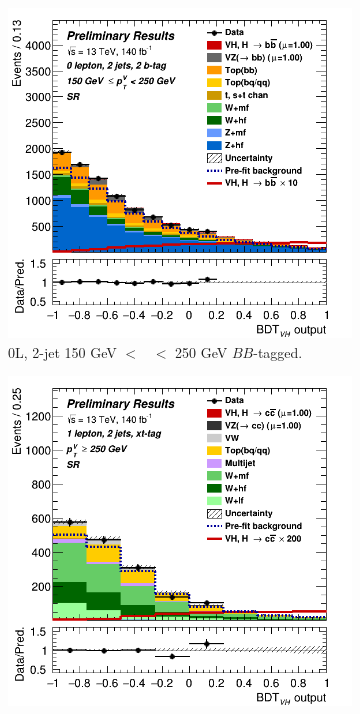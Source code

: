\begin{figure}[h!]
    \centering
    \begin{subfigure}[b]{0.32\textwidth}
        \centering
        \includegraphics[width=\textwidth]{Images/VH/Own_fit/postfit_VHbb/Region_distmva_BMax250_BMin150_DSR_J2_TTypebb_T2_L0_Y6051_GlobalFit_conditionnal_mu1.png}
        \caption{0L, 2-jet 150 GeV $<$ \ptv\ $<$ 250 GeV $BB$-tagged.}
        \label{fig:posfit_0L_SR}
    \end{subfigure}
    \begin{subfigure}[b]{0.32\textwidth}
        \centering
        \includegraphics[width=\textwidth]{Images/VH/Own_fit/postfit_VHcc/Region_distmva_BMin250_DSR_J2_TTypext_T2_L1_Y6051_GlobalFit_conditionnal_mu1.png}

\end{subfigure}
\end{figure}
